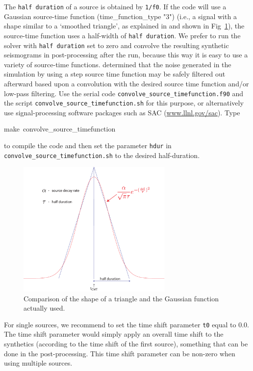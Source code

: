 \documentclass[oneside,english,onecolumn,letterpaper]{book}
\newenvironment{lyxcode}
{\begin{list}{}{
\setlength{\rightmargin}{\leftmargin}
\setlength{\listparindent}{0pt}%
\raggedright
\setlength{\itemsep}{0pt}
\setlength{\parsep}{0pt}
\normalfont\ttfamily}%
 \item[]}
{\end{list}}
\newcommand{\urlwithparentheses}[1]{(\url{#1})}
\begin{document}
\begin{description}
The \texttt{half duration} of a source is obtained by \texttt{1/f0}.
If the code will use a Gaussian source-time function (time\_function\_type "3")
(i.e., a signal with a shape similar to a `smoothed triangle', as
explained in \citet{KoTr02a} and shown in Fig~\ref{fig:gauss.vs.triangle}), the
source-time function uses a half-width of \texttt{half duration}. We prefer
to run the solver with \texttt{half duration} set to zero and convolve
the resulting synthetic seismograms in post-processing after the run,
because this way it is easy to use a variety of source-time functions.
\citet{KoTr02a} determined
that the noise generated in the simulation by using a step source
time function may be safely filtered out afterward based upon a convolution
with the desired source time function and/or low-pass filtering. Use
the serial code \texttt{convolve\_source\_timefunction.f90} and the
script \texttt{convolve\_source\_timefunction.sh} for this purpose,
or alternatively use signal-processing software packages such as SAC \urlwithparentheses{www.llnl.gov/sac}.
Type
\begin{lyxcode}
make~convolve\_source\_timefunction
\end{lyxcode}
to compile the code and then set the parameter \texttt{hdur} in \texttt{convolve\_source\_timefunction.sh}
to the desired half-duration.
\begin{figure}[htbp]
\noindent \begin{centering}
\includegraphics[width=3in]{figures/gauss_vs_triangle_mod.pdf}
\par\end{centering}
\caption{Comparison of the shape of a triangle and the Gaussian function actually
used.}
\label{fig:gauss.vs.triangle}
\end{figure}

\item[t0] For single sources, we recommend to set the time shift parameter \texttt{t0} equal to $0.0$.
The time shift parameter would simply apply
an overall time shift to the synthetics (according to the time shift of the first source), something that can be done
in the post-processing. This time shift parameter can be non-zero when using multiple sources.


\end{description}
\end{document}
